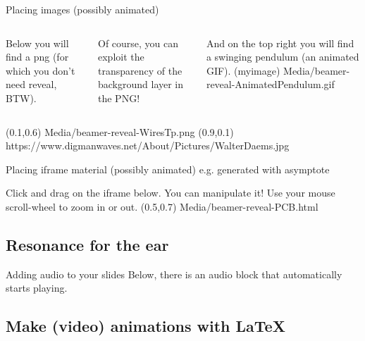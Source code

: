 \documentclass[11pt,aspectratio=1610,t]{beamer}%
\begin{document}
\begin{frame}
  {Placing images (possibly animated)}
  {}
  \begin{columns}
    Below you will find a png (for which you don't need reveal, BTW).
    \vspace*{1cm}

    Of course, you can exploit the transparency of the background layer in the PNG!
    \vspace*{2cm}

    And on the top right you will find a swinging pendulum (an animated GIF).
    \image[width=0.33,aspectratio=1,fit=contain,draw] (myimage) {Media/beamer-reveal-AnimatedPendulum.gif}
  \end{columns}
  \image[width=0.25,aspectratio=1,fit=contain] \at (0.1,0.6) {Media/beamer-reveal-WiresTp.png}
  \image[width=0.1,aspectratio=1,fit=contain] \at (0.9,0.1) {https://www.digmanwaves.net/About/Pictures/WalterDaems.jpg}
\end{frame}

\begin{frame}
  {Placing iframe material (possibly animated)}
  {e.g. generated with asymptote}

  Click and drag on the iframe below. You can manipulate it! Use your mouse
  scroll-wheel to zoom in or out.
  \iframe[draw,anchor=north,height=0.6,aspectratio=16/9,embed,
          fit=cover] \at (0.5,0.7) {Media/beamer-reveal-PCB.html}
\end{frame}


\subsection{Resonance for the ear}

\begin{frame}
  {Adding audio to your slides}
  {}
  Below, there is an audio block
  that automatically starts playing.\\
\end{frame}

\subsection{Make (video) animations with LaTeX}
\end{document}
